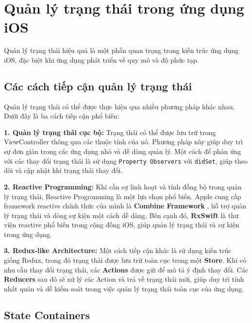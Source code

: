 \section{Quản lý trạng thái trong ứng dụng iOS}

Quản lý trạng thái hiệu quả là một phần quan trọng trong kiến trúc ứng dụng iOS, đặc biệt khi ứng dụng phát triển về quy mô và độ phức tạp.

\subsection{Các cách tiếp cận quản lý trạng thái}

Quản lý trạng thái có thể được thực hiện qua nhiều phương pháp khác nhau. Dưới đây là ba cách tiếp cận phổ biến:

\vspace{0.5em}

\textbf{1. Quản lý trạng thái cục bộ:} Trạng thái có thể được lưu trữ trong ViewController thông qua các thuộc tính của nó. Phương pháp này giúp duy trì sự đơn giản trong các ứng dụng nhỏ và dễ dàng quản lý. Một cách để phản ứng với các thay đổi trạng thái là sử dụng \texttt{Property Observers} với \texttt{didSet}, giúp theo dõi và cập nhật khi trạng thái thay đổi.

\vspace{0.5em}

\textbf{2. Reactive Programming:} Khi cần sự linh hoạt và tính đồng bộ trong quản lý trạng thái, Reactive Programming là một lựa chọn phổ biến. Apple cung cấp framework reactive chính thức của mình là \textbf{Combine Framework} \cite{Combine-Framework}, hỗ trợ quản lý trạng thái và dòng sự kiện một cách dễ dàng. Bên cạnh đó, \textbf{RxSwift} là thư viện reactive phổ biến trong cộng đồng iOS, giúp quản lý trạng thái và sự kiện trong ứng dụng.

\vspace{0.5em}

\textbf{3. Redux-like Architecture:} Một cách tiếp cận khác là sử dụng kiến trúc giống Redux, trong đó trạng thái được lưu trữ toàn cục trong một \textbf{Store}. Khi có nhu cầu thay đổi trạng thái, các \textbf{Actions} được gửi để mô tả ý định thay đổi. Các \textbf{Reducers} sau đó sẽ xử lý các Action và trả về trạng thái mới, giúp duy trì tính nhất quán và dễ kiểm soát trong việc quản lý trạng thái toàn cục của ứng dụng.


\subsection{State Containers}

